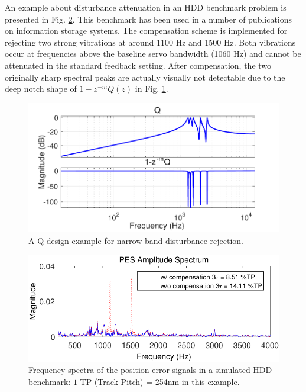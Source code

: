 \documentclass [11pt, proquest] {uwthesis}[2020/02/24]
\begin{document}
An example about disturbance attenuation in an HDD benchmark problem
\cite{sun2016enhanced} is presented in Fig. \ref{fig:Frequency-spectra-of-1}.
This benchmark has been used in a number of publications on information
storage systems. The compensation scheme is implemented for rejecting
two strong vibrations at around 1100 Hz and 1500 Hz. Both vibrations
occur at frequencies above the baseline servo bandwidth (1060 Hz)
and cannot be attenuated in the standard feedback setting. After compensation,
the two originally sharp spectral peaks are actually visually not
detectable due to the deep notch shape of $1-z^{-m}Q(z)$ in Fig.
\ref{fig:A-loop-shaping}.
\begin{figure}[!ht]
\begin{centering}
\includegraphics[width=12cm]{Loop-shaping/Q1minusQ}
\par\end{centering}
\caption{\label{fig:A-loop-shaping}A Q-design example for narrow-band disturbance
rejection.}
\end{figure}
\begin{figure}[!ht]
\begin{centering}
\includegraphics[width=12cm]{Loop-shaping/freqDomain_specPES_compare_iter8_linear}
\par\end{centering}
\caption{\label{fig:Frequency-spectra-of-1}Frequency spectra of the position
error signals in a simulated HDD benchmark: $1$ TP (Track Pitch)
= 254nm in this example.}
\end{figure}
\end{document}
